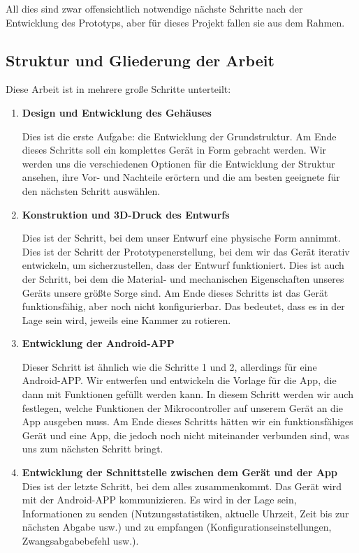 All dies sind zwar offensichtlich notwendige nächste Schritte nach der Entwicklung des Prototyps, aber für dieses Projekt fallen sie aus dem Rahmen.
\newpage
\subsection{Struktur und Gliederung der Arbeit}
Diese Arbeit ist in mehrere große Schritte unterteilt:
\begin{enumerate}
	\item{\textbf{Design und Entwicklung des Gehäuses}}
	
	Dies ist die erste Aufgabe: die Entwicklung der Grundstruktur. Am Ende dieses Schritts soll ein komplettes Gerät in Form gebracht werden. Wir werden uns die verschiedenen Optionen für die Entwicklung der Struktur ansehen, ihre Vor- und Nachteile erörtern und die am besten geeignete für den nächsten Schritt auswählen.
	\item{\textbf{Konstruktion und 3D-Druck des Entwurfs}}
	
	Dies ist der Schritt, bei dem unser Entwurf eine physische Form annimmt. Dies ist der Schritt der Prototypenerstellung, bei dem wir das Gerät iterativ entwickeln, um sicherzustellen, dass der Entwurf funktioniert. Dies ist auch der Schritt, bei dem die Material- und mechanischen Eigenschaften unseres Geräts unsere größte Sorge sind. Am Ende dieses Schritts ist das Gerät funktionsfähig, aber noch nicht konfigurierbar. Das bedeutet, dass es in der Lage sein wird, jeweils eine Kammer zu rotieren.
	\item{\textbf{Entwicklung der Android-APP}}
	
	Dieser Schritt ist ähnlich wie die Schritte 1 und 2, allerdings für eine Android-APP. Wir entwerfen und entwickeln die Vorlage für die App, die dann mit Funktionen gefüllt werden kann. In diesem Schritt werden wir auch festlegen, welche Funktionen der Mikrocontroller auf unserem Gerät an die App ausgeben muss.
	Am Ende dieses Schritts hätten wir ein funktionsfähiges Gerät und eine App, die jedoch noch nicht miteinander verbunden sind, was uns zum nächsten Schritt bringt.
	\item{\textbf{\textbf{Entwicklung der Schnittstelle zwischen dem Gerät und der App}}}
	Dies ist der letzte Schritt, bei dem alles zusammenkommt. Das Gerät wird mit der Android-APP kommunizieren. Es wird in der Lage sein, Informationen zu senden (Nutzungsstatistiken, aktuelle Uhrzeit, Zeit bis zur nächsten Abgabe usw.) und zu empfangen (Konfigurationseinstellungen, Zwangsabgabebefehl usw.).
\end{enumerate}
